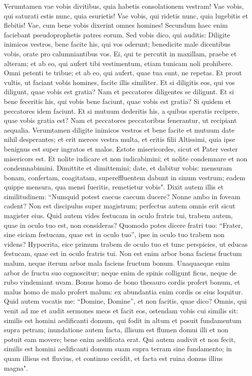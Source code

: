 \begin{biblechapter}
\verse Verumtamen vae vobis divitibus, quia habetis consolationem vestram! 
\verse Vae vobis, qui saturati estis nunc, quia esurietis! Vae vobis, qui ridetis nunc, quia lugebitis et flebitis! 
\verse Vae, cum bene vobis dixerint omnes homines! Secundum haec enim faciebant pseudoprophetis patres eorum. 
\verse Sed vobis dico, qui auditis: Diligite inimicos vestros, bene facite his, qui vos oderunt; 
\verse benedicite male dicentibus vobis, orate pro calumniantibus vos. 
\verse Ei, qui te percutit in maxillam, praebe et alteram; et ab eo, qui aufert tibi vestimentum, etiam tunicam noli prohibere. 
\verse Omni petenti te tribue; et ab eo, qui aufert, quae tua sunt, ne repetas. 
\verse Et prout vultis, ut faciant vobis homines, facite illis similiter. 
\verse Et si diligitis eos, qui vos diligunt, quae vobis est gratia? Nam et peccatores diligentes se diligunt.  
\verse Et si bene feceritis his, qui vobis bene faciunt, quae vobis est gratia? Si quidem et peccatores idem faciunt. 
\verse Et si mutuum dederitis his, a quibus speratis recipere, quae vobis gratia est? Nam et peccatores peccatoribus fenerantur, ut recipiant aequalia. 
\verse Verumtamen diligite inimicos vestros et bene facite et mutuum date nihil desperantes; et erit merces vestra multa, et eritis filii Altissimi, quia ipse benignus est super ingratos et malos. 
\verse Estote misericordes, sicut et Pater vester misericors est. 
\verse Et nolite iudicare et non iudicabimini; et nolite condemnare et non condemnabimini. Dimittite et dimittemini; 
\verse date, et dabitur vobis: mensuram bonam, confertam, coagitatam, supereffluentem dabunt in sinum vestrum; eadem quippe mensura, qua mensi fueritis, remetietur vobis". 
\verse Dixit autem illis et similitudinem: “Numquid potest caecus caecum ducere? Nonne ambo in foveam cadent? 
\verse Non est discipulus super magistrum; perfectus autem omnis erit sicut magister eius. 
\verse Quid autem vides festucam in oculo fratris tui, trabem autem, quae in oculo tuo est, non consideras? 
\verse Quomodo potes dicere fratri tuo: “Frater, sine eiciam festucam, quae est in oculo tuo”, ipse in oculo tuo trabem non videns? Hypocrita, eice primum trabem de oculo tuo et tunc perspicies, ut educas festucam, quae est in oculo fratris tui. 
\verse Non est enim arbor bona faciens fructum malum, neque iterum arbor mala faciens fructum bonum. 
\verse Unaquaeque enim arbor de fructu suo cognoscitur; neque enim de spinis colligunt ficus, neque de rubo vindemiant uvam. 
\verse Bonus homo de bono thesauro cordis profert bonum, et malus homo de malo profert malum: ex abundantia enim cordis os eius loquitur. 
\verse Quid autem vocatis me: “Domine, Domine”, et non facitis, quae dico? 
\verse Omnis, qui venit ad me et audit sermones meos et facit eos, ostendam vobis cui similis sit: 
\verse similis est homini aedificanti domum, qui fodit in altum et posuit fundamentum supra petram; inundatione autem facta, illisum est flumen domui illi et non potuit eam movere; bene enim aedificata erat. 
\verse Qui autem audivit et non fecit, similis est homini aedificanti domum suam supra terram sine fundamento; in quam illisus est fluvius, et continuo cecidit, et facta est ruina domus illius magna". 
\end{biblechapter}

